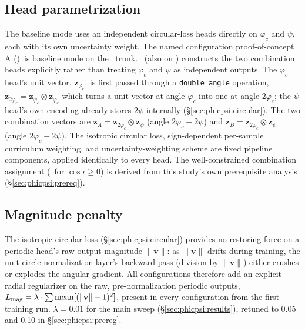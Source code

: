 \subsection{Head parametrization}
\label{sec:phicpsi:heads}

The baseline mode uses an independent circular-loss heads directly on $\varphi_c$ and $\psi$, each with its own uncertainty weight.
The named configuration proof-of-concept A (\pocA)\ is baseline mode on the \Tcn\ trunk.
\pocB\ (also on \Tcn) constructs the two combination heads explicitly rather than treating $\varphi_c$ and $\psi$ as independent outputs.
The $\varphi_c$ head's unit vector, $\mathbf{z}_{\varphi_c}$, is first passed through a \texttt{double\_angle} operation, $\mathbf{z}_{2\varphi_c} = \mathbf{z}_{\varphi_c} \otimes \mathbf{z}_{\varphi_c}$
which turns a unit vector at angle $\varphi_c$ into one at angle $2\varphi_c$; the $\psi$ head's own encoding already stores $2\psi$ internally (\S\ref{sec:phicpsi:circular}).
The two combination vectors are $\mathbf{z}_A = \mathbf{z}_{2\varphi_c}\otimes\mathbf{z}_\psi$ (angle $2\varphi_c+2\psi$) and $\mathbf{z}_B = \mathbf{z}_{2\varphi_c}\otimes\overline{\mathbf{z}_\psi}$ (angle $2\varphi_c-2\psi$).
The isotropic circular loss, sign-dependent per-sample curriculum weighting, and uncertainty-weighting scheme are fixed pipeline components, applied identically to every head.
The well-constrained combination assignment (\comboB\ for $\cos\iota\geq0$) is derived from this study's own prerequisite analysis (\S\ref{sec:phicpsi:prereq}).

\subsection{Magnitude penalty}
\label{sec:phicpsi:penalty}

The isotropic circular loss (\S\ref{sec:phicpsi:circular}) provides no restoring force on a periodic head's raw output magnitude $\|\mathbf{v}\|$: as $\|\mathbf{v}\|$ drifts during training, the unit-circle normalization layer's backward pass (division by $\|\mathbf{v}\|$) either crushes or explodes the angular gradient.
All configurations therefore add an explicit radial regularizer on the raw, pre-normalization periodic outputs, $L_\text{mag} = \lambda \cdot \sum \text{mean}[(\|\mathbf{v}\|-1)^2]$, present in every configuration from the first training run.
$\lambda=0.01$ for the main sweep (\S\ref{sec:phicpsi:results}), retuned to 0.05 and 0.10 in \S\ref{sec:phicpsi:prereg}.

